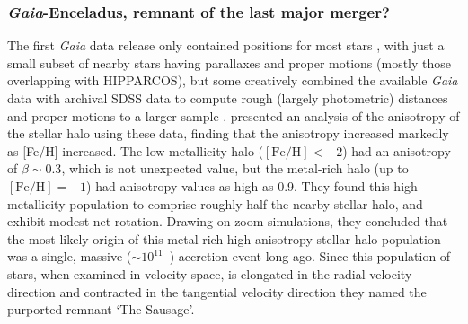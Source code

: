 \subsubsection{\textit{Gaia}-Enceladus, remnant of the last major merger?}

The first \textit{Gaia} data release only contained positions for most stars \parencite{gaiadr1}, with just a small subset of nearby stars having parallaxes and proper motions (mostly those overlapping with HIPPARCOS), but some creatively combined the available \textit{Gaia} data with archival SDSS data to compute rough (largely photometric) distances and proper motions to a larger sample \parencite{deason17,deboer18}. \textcite{belokurov18} presented an analysis of the anisotropy of the stellar halo using these data, finding that the anisotropy increased markedly as [Fe/H] increased. The low-metallicity halo ($\mathrm{[Fe/H]} < -2$) had an anisotropy of $\beta \sim 0.3$, which is not unexpected value, but the metal-rich halo (up to $\mathrm{[Fe/H]}=-1$) had anisotropy values as high as 0.9. They found this high-metallicity population to comprise roughly half the nearby stellar halo, and exhibit modest net rotation. Drawing on zoom simulations, they concluded that the most likely origin of this metal-rich high-anisotropy stellar halo population was a single, massive ($\sim 10^{11}$~\Msun) accretion event long ago. Since this population of stars, when examined in velocity space, is elongated in the radial velocity direction and contracted in the tangential velocity direction they named the purported remnant `The Sausage'.

